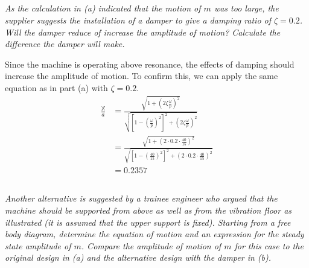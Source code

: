 
\subsection{}
\textit{As the calculation in (a) indicated that the motion of $m$ was too large, the supplier suggests the installation of a damper to give a damping ratio of $\zeta = 0.2$. Will the damper reduce of increase the amplitude of motion? Calculate the difference the damper will make.}

Since the machine is operating above resonance, the effects of damping should increase the amplitude of motion. To confirm this, we can apply the same equation as in part (a) with $\zeta = 0.2$.
\begin{align*}
    \frac{\mathbb{X}}{a} &= \frac{\sqrt{1 + \left(2 \zeta \frac{\omega}{p}\right)^2}}{\sqrt{\left[1 - \left(\frac{\omega}{p}\right)^2\right]^2 + \left(2\zeta\frac{\omega}{p}\right)^2}} \\
    &= \frac{\sqrt{1 + \left(2 \cdot 0.2 \cdot \frac{40}{15}\right)^2}}{\sqrt{\left[1 - \left(\frac{40}{15}\right)^2\right]^2 + \left(2\cdot 0.2 \cdot \frac{40}{15}\right)^2}} \\
    &= \boxed{0.2357}
\end{align*}

\subsection{}
\textit{Another alternative is suggested by a trainee engineer who argued that the machine should be supported from above as well as from the vibration floor as illustrated (it is assumed that the upper support is fixed). Starting from a free body diagram, determine the equation of motion and an expression for the steady state amplitude of $m$. Compare the amplitude of motion of $m$ for this case to the original design in (a) and the alternative design with the damper in (b).}

